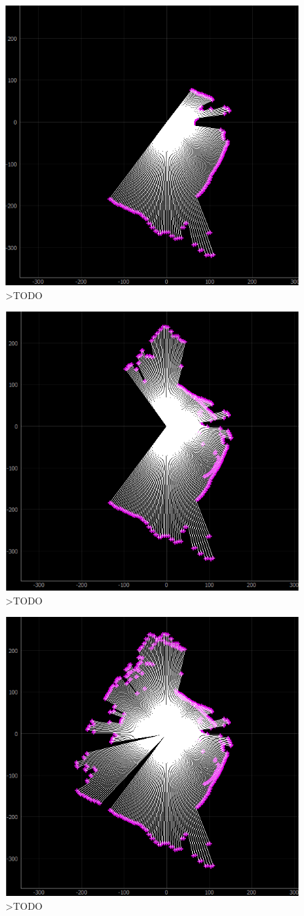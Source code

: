 


\begin{figure}[ht]
	\centering
		\includegraphics[width=0.5\linewidth]{rys/ScanBot-12-calibrated-room-map1.PNG}
	\caption{>TODO}
	\label{fig:}
\end{figure}

\begin{figure}[ht]
	\centering
		\includegraphics[width=0.5\linewidth]{rys/ScanBot-12-calibrated-room-map2.PNG}
	\caption{>TODO}
	\label{fig:xxx}
\end{figure}

\begin{figure}[ht]
	\centering
		\includegraphics[width=0.5\linewidth]{rys/ScanBot-12-calibrated-room-map3.PNG}
	\caption{>TODO}
	\label{fig:xxx}
\end{figure}

